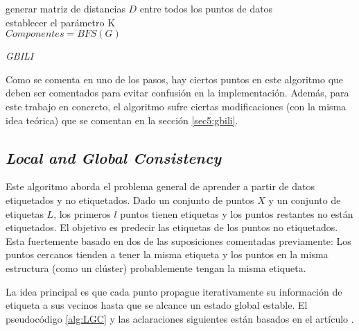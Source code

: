 \begin{algorithm}
	\label{alg:Gbili}
	\BlankLine
	generar matriz de distancias $D$ entre todos los puntos de datos\\
	establecer el parámetro K\\
	$Componentes = BFS(G)$\\
	\caption{\textit{GBILI}}
\end{algorithm}
\clearpage
Como se comenta en uno de los pasos, hay ciertos puntos en este algoritmo que deben ser comentados para evitar confusión en la implementación. Además, para este trabajo en concreto, el algoritmo sufre ciertas modificaciones (con la misma idea teórica) que se comentan en la sección \ref{sec5:gbili}.

\subsection{\textit{Local and Global Consistency}}
Este algoritmo aborda el problema general de aprender a partir de datos etiquetados y no etiquetados. Dado un conjunto de puntos $X$ y un conjunto de etiquetas $L$, los primeros $l$ puntos tienen etiquetas y los puntos restantes no están etiquetados. El objetivo es predecir las etiquetas de los puntos no etiquetados. Esta fuertemente basado en dos de las suposiciones comentadas previamente: Los puntos cercanos tienden a tener la misma etiqueta y los puntos en la misma estructura (como un clúster) probablemente tengan la misma etiqueta.

La idea principal es que cada punto propague iterativamente su información de etiqueta a sus vecinos hasta que se alcance un estado global estable. El pseudocódigo \ref{alg:LGC} y las aclaraciones siguientes están basados en el artículo \cite{LGC}.

